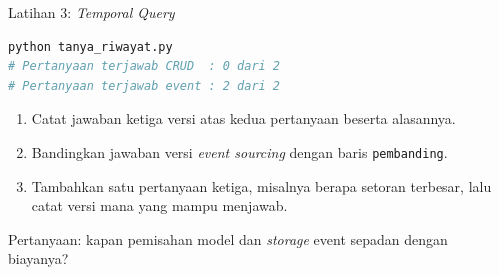 \documentclass[aspectratio=169, table, 12pt]{beamer}
\begin{document}
\begin{frame}[fragile]{{\Large Latihan 3: \textit{Temporal Query}}}
  \vspace{3pt}
\begin{lstlisting}[language=bash]
python tanya_riwayat.py
# Pertanyaan terjawab CRUD  : 0 dari 2
# Pertanyaan terjawab event : 2 dari 2
\end{lstlisting}

  \vspace{3pt}
  \begin{enumerate}\small
    \item Catat jawaban ketiga versi atas kedua pertanyaan beserta alasannya.
    \item Bandingkan jawaban versi \textit{event sourcing} dengan baris
          \texttt{pembanding}.
    \item Tambahkan satu pertanyaan ketiga, misalnya berapa setoran terbesar,
          lalu catat versi mana yang mampu menjawab.
  \end{enumerate}

  \vspace{3pt}
  {\small Pertanyaan: kapan pemisahan model dan \textit{storage} event sepadan
  dengan biayanya?}
\end{frame}
\end{document}
